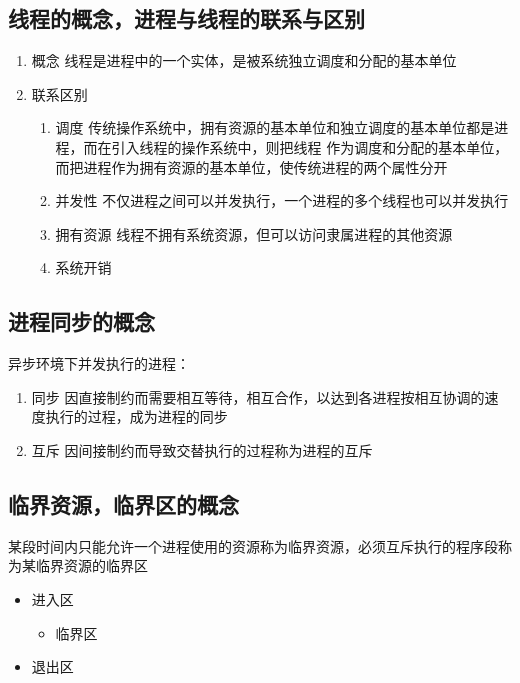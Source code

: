 \documentclass[11pt]{article}
\begin{document}
\subsection{线程的概念，进程与线程的联系与区别}
\label{sec-2-5}
\begin{enumerate}
\item 概念
\label{sec-2-5-0-1}
线程是进程中的一个实体，是被系统独立调度和分配的基本单位
\item 联系区别
\label{sec-2-5-0-2}
\begin{enumerate}
\item 调度
\label{sec-2-5-0-2-1}
      传统操作系统中，拥有资源的基本单位和独立调度的基本单位都是进程，而在引入线程的操作系统中，则把线程
作为调度和分配的基本单位，而把进程作为拥有资源的基本单位，使传统进程的两个属性分开
\item 并发性
\label{sec-2-5-0-2-2}
不仅进程之间可以并发执行，一个进程的多个线程也可以并发执行
\item 拥有资源
\label{sec-2-5-0-2-3}
线程不拥有系统资源，但可以访问隶属进程的其他资源
\item 系统开销
\label{sec-2-5-0-2-4}
\end{enumerate}
\end{enumerate}

\subsection{进程同步的概念}
\label{sec-2-6}
异步环境下并发执行的进程：
\begin{enumerate}
\item 同步
\label{sec-2-6-0-1}
因直接制约而需要相互等待，相互合作，以达到各进程按相互协调的速度执行的过程，成为进程的同步
\item 互斥
\label{sec-2-6-0-2}
因间接制约而导致交替执行的过程称为进程的互斥
\end{enumerate}
\subsection{临界资源，临界区的概念}
\label{sec-2-7}
某段时间内只能允许一个进程使用的资源称为临界资源，必须互斥执行的程序段称为某临界资源的临界区
\begin{itemize}
\item 进入区
\begin{itemize}
\item 临界区
\end{itemize}
\item 退出区
\end{itemize}
\end{document}
